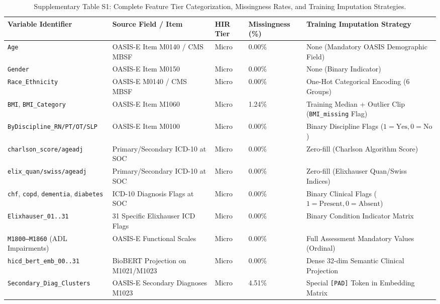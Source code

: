 \documentclass[10pt,journal]{IEEEtran}
\begin{document}
\begin{table}[!t]
\caption{Supplementary Table S1: Complete Feature Tier Categorization, Missingness Rates, and Training Imputation Strategies.}
\label{tab:s_predictor_dictionary}
\centering
\footnotesize
\begin{tabular}{p{}p{}p{}p{}p{}}
\toprule
\textbf{Variable Identifier} & \textbf{Source Field / Item} & \textbf{HIR Tier} & \textbf{Missingness (\%)} & \textbf{Training Imputation Strategy} \\
\midrule
\texttt{Age} & OASIS-E Item M0140 / CMS MBSF & Micro & 0.00\% & None (Mandatory OASIS Demographic Field) \\
\texttt{Gender} & OASIS-E Item M0150 & Micro & 0.00\% & None (Binary Indicator) \\
\texttt{Race\_Ethnicity} & OASIS-E M0140 / CMS MBSF & Micro & 0.00\% & One-Hot Categorical Encoding (6 Groups) \\
\texttt{BMI}, \texttt{BMI\_Category} & OASIS-E Item M1060 & Micro & 1.24\% & Training Median + Outlier Clip (\texttt{BMI\_missing} Flag) \\
\texttt{ByDiscipline\_RN/PT/OT/SLP} & OASIS-E Item M0100 & Micro & 0.00\% & Binary Discipline Flags ($1=\text{Yes}, 0=\text{No}$) \\
\texttt{charlson\_score/ageadj} & Primary/Secondary ICD-10 at SOC & Micro & 0.00\% & Zero-fill (Charlson Algorithm Score) \\
\texttt{elix\_quan/swiss/ageadj} & Primary/Secondary ICD-10 at SOC & Micro & 0.00\% & Zero-fill (Elixhauser Quan/Swiss Indices) \\
\texttt{chf}, \texttt{copd}, \texttt{dementia}, \texttt{diabetes} & ICD-10 Diagnosis Flags at SOC & Micro & 0.00\% & Binary Clinical Flags ($1=\text{Present}, 0=\text{Absent}$) \\
\texttt{Elixhauser\_01..31} & 31 Specific Elixhauser ICD Flags & Micro & 0.00\% & Binary Condition Indicator Matrix \\
\texttt{M1800--M1860} (ADL Impairments) & OASIS-E Functional Scales & Micro & 0.00\% & Full Assessment Mandatory Values (Ordinal) \\
\texttt{hicd\_bert\_emb\_00..31} & BioBERT Projection on M1021/M1023 & Micro & 0.00\% & Dense 32-dim Semantic Clinical Projection \\
\texttt{Secondary\_Diag\_Clusters} & OASIS-E Secondary Diagnoses M1023 & Micro & 4.51\% & Special \texttt{[PAD]} Token in Embedding Matrix \\

\end{tabular}
\end{table}
\end{document}
